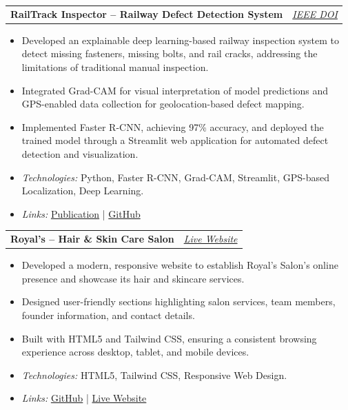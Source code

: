 \documentclass[10pt]{article}
\makeatletter
\newcommand{\entry}[2]{%
  \noindent\begin{tabularx}{\linewidth}{@{}X r@{}}
    \textbf{#1} & \textit{\small #2}
  \end{tabularx}\vspace{-1pt}
}
\makeatother
\begin{document}
\entry{RailTrack Inspector -- Railway Defect Detection System}{\href{https://doi.org/10.1109/QPAIN69676.2026.11546344}{IEEE DOI}}
\begin{itemize}
    \item Developed an explainable deep learning-based railway inspection system to detect missing fasteners, missing bolts, and rail cracks, addressing the limitations of traditional manual inspection.
    \item Integrated Grad-CAM for visual interpretation of model predictions and GPS-enabled data collection for geolocation-based defect mapping.
    \item Implemented Faster R-CNN, achieving 97\% accuracy, and deployed the trained model through a Streamlit web application for automated defect detection and visualization.
    \item \textit{Technologies:} Python, Faster R-CNN, Grad-CAM, Streamlit, GPS-based Localization, Deep Learning.
    \item \textit{Links:} \href{https://doi.org/10.1109/QPAIN69676.2026.11546344}{Publication} \;|\;
    \href{https://github.com/MdMehedi-Hassan/RailTrack-Inspector}{GitHub}
\end{itemize}

\vspace{4pt}

\entry{Royal's -- Hair \& Skin Care Salon}{\href{https://royals-salon.netlify.app/}{Live Website}}
\begin{itemize}
    \item Developed a modern, responsive website to establish Royal's Salon's online presence and showcase its hair and skincare services.
    \item Designed user-friendly sections highlighting salon services, team members, founder information, and contact details.
    \item Built with HTML5 and Tailwind CSS, ensuring a consistent browsing experience across desktop, tablet, and mobile devices.
    \item \textit{Technologies:} HTML5, Tailwind CSS, Responsive Web Design.
    \item \textit{Links:} \href{https://github.com/MdMehedi-Hassan/Royal-s-Hair-and-Skin-Care-Salon}{GitHub} \;|\;
    \href{https://royals-salon.netlify.app/}{Live Website}
\end{itemize}

\vspace{4pt}
\end{document}
